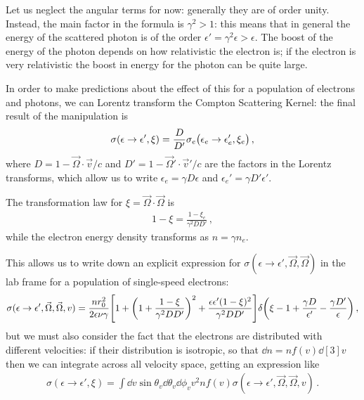 \documentclass[main.tex]{subfiles}
\begin{document}
Let us neglect the angular terms for now: generally they are of order unity. Instead, the main factor in the formula is \(\gamma^2>1\): this means that in general the energy of the scattered photon is of the order \(\epsilon ' = \gamma^2 \epsilon > \epsilon  \). 
The boost of the energy of the photon depends on how relativistic the electron is; if the electron is very relativistic the boost in energy for the photon can be quite large. 

In order to make predictions about the effect of this for a population of electrons and photons, we can Lorentz transform the Compton Scattering Kernel: the final result of the manipulation is
%
\begin{align}
\sigma (\epsilon \to \epsilon ', \xi ) = \frac{D}{D'} \sigma_e \qty(\epsilon _e \to \epsilon _e', \xi _e)
\,,
\end{align}
%
where \(D = 1 - \vec{\Omega} \cdot \vec{v} / c\) and \(D' = 1 - \vec{\Omega}' \cdot \vec{v}' / c \) are the factors in the Lorentz transforms, which allow us to write \(\epsilon _e = \gamma D \epsilon \) and \(\epsilon _e' = \gamma D' \epsilon '\).

The transformation law for \(\xi = \vec{\Omega} \cdot \vec{\Omega}\) is 
%
\begin{align}
1 - \xi = \frac{1 - \xi _e}{\gamma^2 D D'}
\,,
\end{align}
%
while the electron energy density transforms as \(n = \gamma n_e\). 

This allows us to write down an explicit expression for \(\sigma (\epsilon \to \epsilon ', \vec{\Omega}, \vec{\Omega})\) in the lab frame for a population of single-speed electrons:
%
\begin{align}
\sigma (\epsilon \to \epsilon ', \vec{\Omega}, \vec{\Omega}, v) 
= 
\frac{n r_0^2}{2 \epsilon \nu \gamma } 
\qty[1 + \qty(1 + \frac{1 - \xi }{\gamma^2 D D'})^2
+ \frac{\epsilon \epsilon ' (1 - \xi )^2}{\gamma^2 D D'}]
\delta \qty(\xi -1 + \frac{\gamma D}{\epsilon'} - \frac{\gamma D'}{\epsilon })
\,,
\end{align}
%
but we must also consider the fact that the electrons are distributed with different velocities: if their distribution is isotropic, so that \(\dd{n} = n f(v) \dd[3]{v}\) then we can integrate across all velocity space, getting an expression like 
%
\begin{align}
\sigma (\epsilon \to \epsilon ', \xi )
= \int \dd{v} \sin \theta_v \dd{\theta _v} \dd{\phi _v}
 v^2 n f(v) 
\sigma (\epsilon \to \epsilon ', \vec{\Omega}, \vec{\Omega}, v)  
\,.
\end{align}
\end{document}
